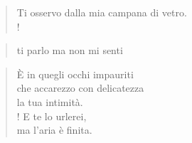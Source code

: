 
\begin{verse}
Ti osservo dalla mia campana di vetro.\\!
\end{verse}

\begin{verse}
    ti parlo \hfill ma non mi senti
\end{verse}

\begin{verse}
    È in quegli occhi impauriti\\
    che accarezzo con delicatezza\\
    la tua intimità.\\!
    E te lo urlerei,\\
    ma l'aria è finita.
\end{verse}